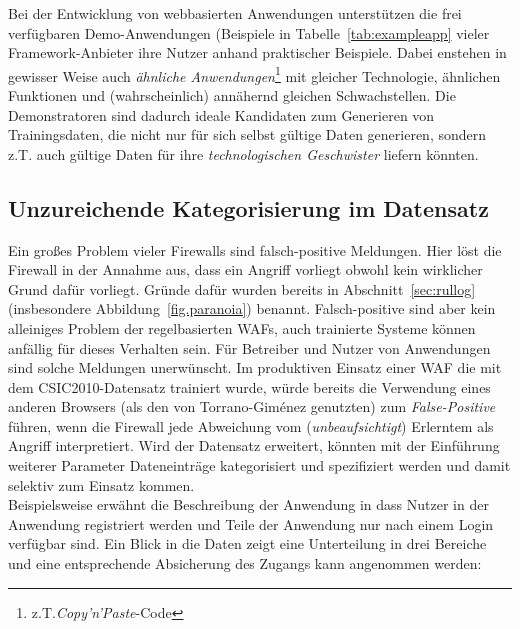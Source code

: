 \subsubsection{}
Bei der Entwicklung von webbasierten Anwendungen unterstützen die frei verfügbaren Demo-Anwendungen (Beispiele in Tabelle~\ref{tab:exampleapp} vieler Framework-Anbieter ihre Nutzer anhand praktischer Beispiele. Dabei enstehen in gewisser Weise auch \emph{ähnliche Anwendungen}\footnote{z.T.\emph{Copy'n'Paste}-Code} mit gleicher Technologie, ähnlichen Funktionen und (wahrscheinlich) annähernd gleichen Schwachstellen. Die Demonstratoren sind dadurch ideale Kandidaten zum Generieren von Trainingsdaten, die nicht nur für sich selbst gültige Daten generieren, sondern z.T. auch gültige Daten für ihre \glqq\emph{technologischen Geschwister}\glqq{} liefern könnten.


\subsection{Unzureichende Kategorisierung im Datensatz}
\label{sec:Kategorisierung}
Ein großes Problem vieler Firewalls sind falsch-positive Meldungen. Hier löst die Firewall in der Annahme aus, dass ein Angriff vorliegt obwohl kein wirklicher Grund dafür vorliegt. Gründe dafür wurden bereits in Abschnitt~\ref{sec:rullog} (insbesondere Abbildung~\ref{fig.paranoia}) benannt. Falsch-positive sind aber kein alleiniges Problem der regelbasierten WAFs, auch trainierte Systeme können anfällig für dieses Verhalten sein. Für Betreiber und Nutzer von Anwendungen sind solche Meldungen unerwünscht. Im produktiven Einsatz einer WAF die mit dem CSIC2010-Datensatz trainiert wurde, würde bereits die Verwendung eines anderen Browsers (als den von Torrano-Giménez genutzten) zum \emph{False-Positive} führen, wenn die Firewall jede Abweichung vom (\emph{unbeaufsichtigt}) Erlerntem als Angriff interpretiert. Wird der Datensatz erweitert, könnten mit der Einführung weiterer Parameter Dateneinträge kategorisiert und spezifiziert werden und damit selektiv zum Einsatz kommen.\\ Beispielsweise erwähnt die Beschreibung der Anwendung in \cite{csic2010} dass Nutzer in der Anwendung registriert werden und Teile der Anwendung nur nach einem Login verfügbar sind. Ein Blick in die Daten zeigt eine Unterteilung in drei Bereiche und eine entsprechende Absicherung des Zugangs kann angenommen werden: 

